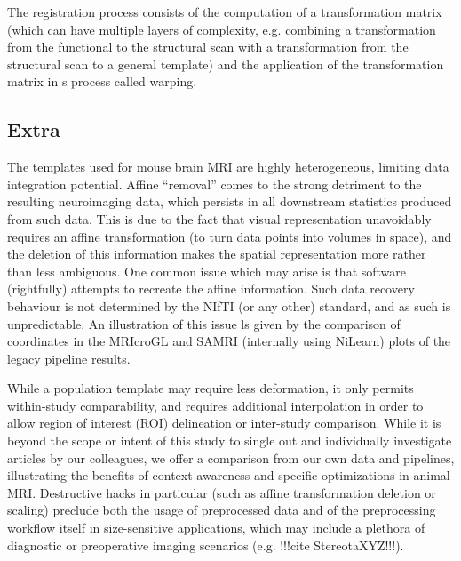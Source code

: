 The registration process consists of the computation of a transformation matrix (which can have multiple layers of complexity, e.g. combining a transformation from the functional to the structural scan with a transformation from the structural scan to a general template) and the application of the transformation matrix in s process called warping.

	\subsection{Extra}
	The templates used for mouse brain MRI are highly heterogeneous, limiting data integration potential.
	Affine “removal” comes to the strong detriment to the resulting neuroimaging data, which persists in all downstream statistics produced from such data.
	This is due to the fact that visual representation unavoidably requires an affine transformation (to turn data points into volumes in space), and the deletion of this information makes the spatial representation more rather than less ambiguous.
	One common issue which may arise is that software (rightfully) attempts to recreate the affine information.
	Such data recovery behaviour is not determined by the NIfTI (or any other) standard, and as such is unpredictable.
	An illustration of this issue ls given by the comparison of coordinates in the MRIcroGL and SAMRI (internally using NiLearn) plots of the legacy pipeline results.
	
	While a population template may require less deformation, it only permits within-study comparability, and requires additional interpolation in order to allow region of interest (ROI) delineation or inter-study comparison.
	While it is beyond the scope or intent of this study to single out and individually investigate articles by our colleagues, we offer a comparison from our own data and pipelines, illustrating the benefits of context awareness and specific optimizations in animal MRI.
	Destructive hacks in particular (such as affine transformation deletion or scaling) preclude both the usage of preprocessed data and of the preprocessing workflow itself in size-sensitive applications, which may include a plethora of diagnostic or preoperative imaging scenarios (e.g. !!!cite StereotaXYZ!!!).
	
